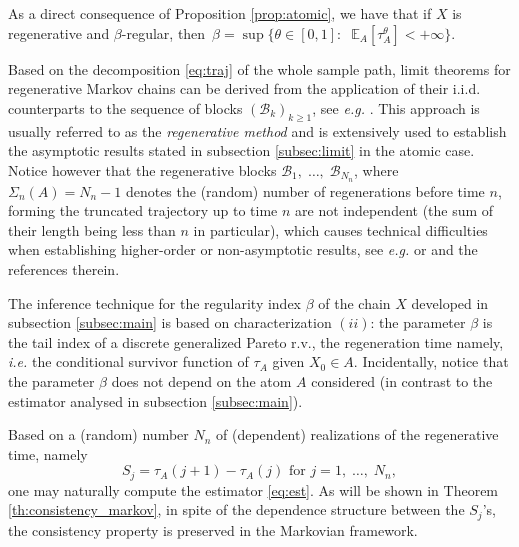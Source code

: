 \documentclass[sn-mathphys-ay]{sn-jnl}%
\begin{document}
As a direct consequence of Proposition \ref{prop:atomic}, we have that if $X$ is
regenerative and $\beta$-regular, then $\,\beta=\sup\{\theta\in [0,1]:\;\;
    \mathbb{E}_A\left[\tau_A^{\theta} \right]<+\infty\}$.

Based on the decomposition \eqref{eq:traj} of the whole sample path, limit theorems for
regenerative Markov chains can be derived from the application of their i.i.d.
counterparts to the sequence of blocks $(\mathcal{B}_k)_{k\geq 1}$, see \textit{e.g.}
\cite{Meyn2009}. This approach is usually referred to as the \textit{regenerative method}
and is extensively used to establish the asymptotic results stated in subsection
\ref{subsec:limit} in the atomic case. Notice however that the regenerative blocks
$\mathcal{B}_{1},\; \ldots,\; \mathcal{B}_{N_n}$, where $\Sigma_n(A)=N_n-1$ denotes the
(random) number of regenerations before time $n$, forming the truncated trajectory up to
time $n$ are not independent (the sum of their length being less than $n$ in particular),
which causes technical difficulties when establishing higher-order or non-asymptotic
results, see \textit{e.g.} \cite{Bertail2006} or \cite{bertail2004edgeworth} and the
references therein.

The inference technique for the regularity index $\beta$ of the chain $X$ developed in
subsection \ref{subsec:main} is based on characterization $(ii)$: the parameter $\beta$
is the tail index of a discrete generalized Pareto r.v., the regeneration time namely,
\textit{i.e.} the conditional survivor function of $\tau_A$ given $X_0\in A$.
Incidentally, notice that the parameter $\beta$ does not depend on the atom $A$
considered (in contrast to the estimator analysed in subsection \ref{subsec:main}).

Based on a (random) number $N_n$ of (dependent) realizations of the regenerative time, namely
\begin{equation*}
    S_j=\tau_A(j+1)-\tau_A(j) \text{ for } j=1,\; \ldots,\; N_n,
\end{equation*}
one may naturally compute the estimator \eqref{eq:est}. As will be shown in Theorem \ref{th:consistency_markov}, in spite of
the dependence structure between the $S_j$'s, the consistency property is preserved in
the Markovian framework.

\end{document}
